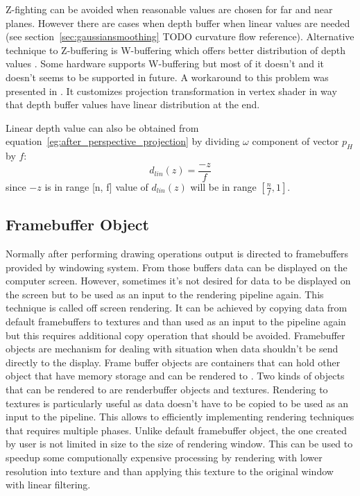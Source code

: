 Z-fighting can be avoided when reasonable values are chosen for far and near planes. However there are cases when depth buffer when linear values are needed (see section~\ref{sec:gaussiansmoothing} TODO curvature flow reference). Alternative technique to Z-buffering is W-buffering which offers better distribution of depth values \cite{Gregory2009}. Some hardware supports W-buffering but most of it doesn't and it doesn't seems to be supported in future. A workaround to this problem was presented in \cite{Dunlop2006}. It customizes projection transformation in vertex shader in way that depth buffer values have linear distribution at the end. 

Linear depth value can also be obtained from equation~\ref{eg:after_perspective_projection} by dividing $\omega$ component of vector $p_H$ by $f$:
\begin{equation}
\label{eq:linear_depth}
d_{lin}(z) = \frac{-z}{f}
\end{equation}
since $-z$ is in range [n, f] value of $d_{lin}(z)$ will be in range $[\frac{n}{f}, 1]$. 


\subsection{Framebuffer Object}
Normally after performing drawing operations output is directed to framebuffers provided by windowing system. From those buffers data can be displayed on the computer screen. However, sometimes it's not desired for data to be displayed on the screen but to be used as an input to the rendering pipeline again. This technique is called off screen rendering. It can be achieved by copying data from default framebuffers to textures and than used as an input to the pipeline again but this requires additional copy operation that should be avoided. Framebuffer objects are mechanism for dealing with situation when data shouldn't be send directly to the display. Frame buffer objects are containers that can hold other object that have memory storage and can be rendered to \cite[chapter~8]{OpenGLSuperbible}. Two kinds of objects that can be rendered to are renderbuffer objects and textures. Rendering to textures is particularly useful as data doesn't have to be copied to be used as an input to the pipeline. This allows to efficiently implementing rendering techniques that requires multiple phases.
Unlike default framebuffer object, the one created by user is not limited in size to the size of rendering window. This can be used to speedup some computionally expensive processing by rendering with lower resolution into texture and than applying this texture to the original window with linear filtering. 

